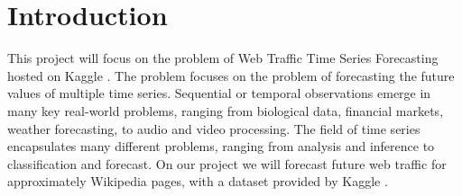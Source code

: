 \section{Introduction}

This project will focus on the problem of Web Traffic Time Series Forecasting hosted on Kaggle \cite{kaggle}.
The problem focuses on the problem of forecasting the future values of multiple time series.
Sequential or temporal observations emerge in many key real-world problems, ranging from biological data,
financial markets, weather forecasting, to audio and video processing.
The field of time series encapsulates many different problems,
ranging from analysis and inference to classification and forecast.
On our project we will forecast future web traffic for approximately Wikipedia pages,
with a dataset provided by Kaggle \cite{kaggle_data}.

